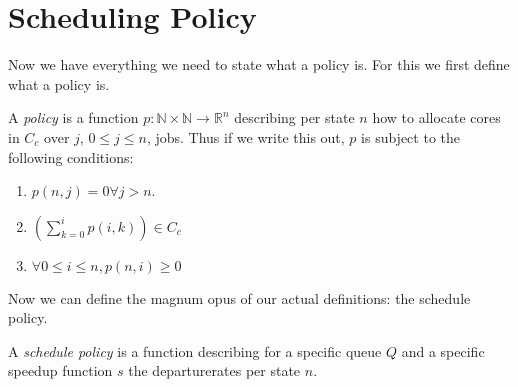 \section{Scheduling Policy}
Now we have everything we need to state what a policy is. For this we first define what a policy is.
\begin{definition}\label{def:Policy}\leanok
  A \textit{policy} is a function $p \colon \mathbb{N} \times \mathbb{N} \to \mathbb{R}^n$ describing
  per state $n$ how to allocate cores in $C_c$ over $j$, $0 \leq j \leq n$, jobs. Thus if we write this out,
  $p$ is subject to the following conditions:
  \begin{enumerate}
    \item $p(n,j) = 0 \forall j > n$.
    \item $\left(\sum_{k=0}^i p(i, k)\right) \in C_c$
    \item $\forall 0 \leq i \leq n, p(n,i) \geq 0$
  \end{enumerate}
\end{definition}

Now we can define the magnum opus of our actual definitions: the schedule policy.
\begin{definition}\label{def:SchedulePolicy}\notready
  A \textit{schedule policy} is a function describing for a specific queue $Q$ and a specific speedup function
  $s$ the departurerates per state $n$.
\end{definition}
